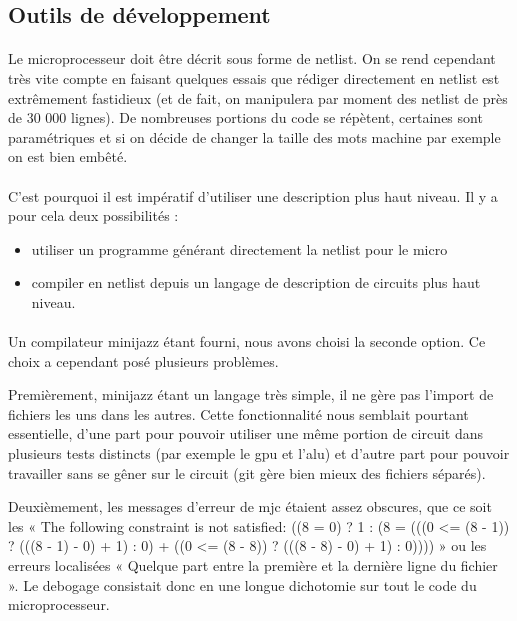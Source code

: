\documentclass{article}
\begin{document}
\subsection{Outils de développement}

\paragraph{}Le microprocesseur doit être décrit sous forme de netlist. On se rend cependant très vite compte en faisant quelques essais que rédiger directement en netlist est extrêmement fastidieux (et de fait, on manipulera par moment des netlist de près de 30 000 lignes). De nombreuses portions du code se répètent, certaines sont paramétriques et si on décide de changer la taille des mots machine par exemple on est bien embêté.

\paragraph{}C'est pourquoi il est impératif d'utiliser une description plus haut niveau. Il y a pour cela deux possibilités :
\begin{itemize}
	\item utiliser un programme générant directement la netlist pour le micro
	\item compiler en netlist depuis un langage de description de circuits plus haut niveau.
\end{itemize}

\paragraph{}Un compilateur minijazz étant fourni, nous avons choisi la seconde option. Ce choix a cependant posé plusieurs problèmes.

Premièrement, minijazz étant un langage très simple, il ne gère pas l'import de fichiers les uns dans les autres. Cette fonctionnalité nous semblait pourtant essentielle, d'une part pour pouvoir utiliser une même portion de circuit dans plusieurs tests distincts (par exemple le gpu et l'alu) et d'autre part pour pouvoir travailler sans se gêner sur le circuit (git gère bien mieux des fichiers séparés).

Deuxièmement, les messages d'erreur de mjc étaient assez obscures, que ce soit les « The following constraint is not satisfied: ((8 = 0) ? 1 : (8 = (((0 <= (8 - 1)) ? (((8 - 1) - 0) + 1) : 0) + ((0 <= (8 - 8)) ? (((8 - 8) - 0) + 1) : 0)))) » ou les erreurs localisées « Quelque part entre la première et la dernière ligne du fichier ». Le debogage consistait donc en une longue dichotomie sur tout le code du microprocesseur.
\end{document}
